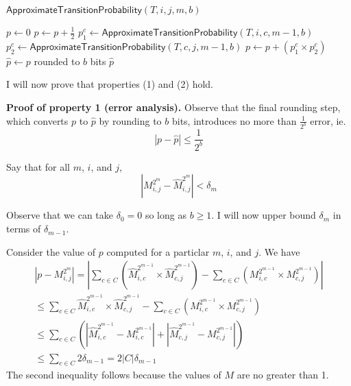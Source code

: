 \documentclass{article}
\begin{document}
\begin{algorithm}{$\mathsf{ApproximateTransitionProbability}(T, i, j, m, b)$}
	\begin{algorithmic}[1]
	\STATE {}
	\STATE $p \gets 0$ 
		  \STATE $p \gets p + \frac{1}{2}$
		\ENDIF
	  \ENDFOR
	\ELSE
		\STATE $p_1^c \gets \mathsf{ApproximateTransitionProbability}(T, i, c, m-1, b)$
		\STATE $p_2^c \gets \mathsf{ApproximateTransitionProbability}(T, c, j, m-1, b)$
		\STATE $p \gets p + (p_1^c \times p_2^c)$
	  \ENDFOR
	  \STATE $\hat{p} \gets p$ rounded to $b$ bits
	\ENDIF
	\RETURN $\hat{p}$
	\end{algorithmic}
\end{algorithm}

I will now prove that properties (1) and (2) hold.

\medskip
\noindent \textbf{Proof of property 1 (error analysis).}
Observe that the final rounding step, which converts $p$ to $\hat{p}$ by rounding to $b$ bits, introduces no more than $\frac{1}{2^b}$ error, ie.
$$
|p - \hat{p}| \leq \frac{1}{2^b}
$$

Say that for all $m$, $i$, and $j$,
$$
|M_{i, j}^{2^m} - \hat{M}_{i, j}^{2^m}| < \delta_m
$$

Observe that we can take $\delta_0 = 0$ so long as $b \geq 1$.
I will now upper bound $\delta_m$ in terms of $\delta_{m-1}$.

Consider the value of $p$ computed for a particlar $m$, $i$, and $j$.  We have
\begin{multline*}
	|p - M_{i, j}^{2^m}| = |\sum_{c \in C}{(\hat{M}_{i, c}^{2^{m-1}} \times \hat{M}_{c, j}^{2^{m-1}})} - \sum_{c \in C}{(M_{i, c}^{2^{m-1}} \times M_{c, j}^{2^{m-1}})}|
	\\
	\leq \sum_{c \in C}{
		\hat{M}_{i, c}^{2^{m-1}} \times \hat{M}_{c, j}^{2^{m-1}} -
		\sum_{c \in C}{(M_{i, c}^{2^{m-1}} \times M_{c, j}^{2^{m-1}})}
	} \\
	\leq \sum_{c \in C}{(|\hat{M}_{i, c}^{2^{m-1}} - M_{i, c}^{2^{m-1}}| + |\hat{M}_{c, j}^{2^{m-1}} - M_{c, j}^{2^{m-1}}|)} \\
	\leq \sum_{c \in C} 2\delta_{m-1} = 2|C|\delta_{m-1}
\end{multline*}
The second inequality follows because the values of $M$ are no greater than 1.
\end{document}
